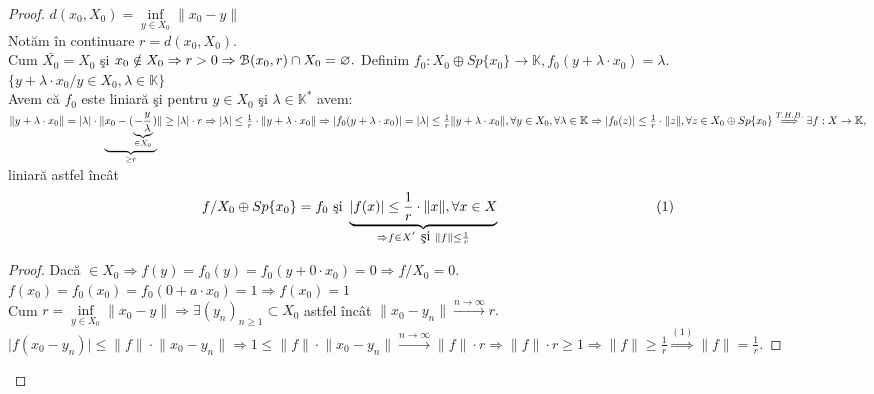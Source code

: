 \documentclass[ a4paper, 12pt]{report}
\theoremstyle{remark}
\numberwithin{equation}{section}
\begin{document}
\begin{proof}
$d(x_0,X_0) = \inf\limits_{y \in X_0} \lVert x_0 - y \rVert$\\
Not\u am \^in continuare $r = d(x_0,X_0).$\\
Cum $\bar{X_0} = X_0$ \c si $x_0 \notin X_0 \Rightarrow r>0\\
\Rightarrow \mathcal{B}(x_0,r) \cap X_0 = \varnothing.$
Definim $f_0 : X_0\oplus Sp\{x_0\} \rightarrow \mathbb{K}, f_0(y + \lambda \cdot x_0) = \lambda.$\\
$\{ y + \lambda \cdot x_0 / y \in X_0, \lambda \in \mathbb{K} \}$\\
Avem c\u a $f_0$ este liniar\u a \c si pentru $y \in X_0$ \c si $\lambda \in \mathbb{K}^{\ast}$ avem:\\
$\lVert  y + \lambda \cdot x_0 \rVert = \lvert \lambda \rvert \cdot \lVert \underbrace{ x_0 - (\underbrace{-\frac{y}{\lambda}}_{\in X_0})}_{\geq r} \rVert \geq \lvert \lambda \rvert \cdot r \Rightarrow \lvert \lambda \rvert \leq \frac{1}{r} \cdot \lVert y+\lambda \cdot x_0 \rVert \Rightarrow\\
 \lvert f_0(y + \lambda \cdot x_0) \rvert = \lvert \lambda \rvert \leq \frac{1}{r}\lVert y + \lambda \cdot x_0  \rVert, \forall y \in X_0, \forall \lambda \in \mathbb{K} \Rightarrow \lvert f_0(z) \rvert \leq \frac{1}{r} \cdot \lVert z \rVert, \forall z \in X_0 \oplus Sp\{x_0\} \stackrel{T.H.B.}{\Longrightarrow} \exists f : X \rightarrow \mathbb{K},$ liniar\u a astfel \^inc\^at\\
 \[f / X_0 \oplus Sp\{ x_0 \} = f_0\ \mbox{\c si}\ \underbrace{\lvert f(x) \rvert \leq \frac{1}{r} \cdot \lVert x \rVert, \forall x \in X}_{ \Rightarrow f \in X^{'}\ \mbox{\c si}\  \lVert f  \rVert \leq \frac{1}{r}}\hspace{40mm} (1)\]
 \begin{proof}
 Dac\u a $ \in X_0 \Rightarrow f(y) = f_0(y) = f_0(y + 0 \cdot x_0) = 0 \Rightarrow f/X_0 = 0.$\\
 $f(x_0) = f_0(x_0) = f_0(0 + a \cdot x_0) = 1 \Rightarrow f(x_0) = 1$\\
 Cum $r = \inf\limits_{y \in X_0} \lVert x_0 - y  \rVert \Rightarrow \exists (y_n)_{n \geq 1} \subset X_0$ astfel \^inc\^at $\lVert x_0 - y_n \rVert \stackrel{n \rightarrow \infty}{\longrightarrow} r.$\\
 $\lvert f(x_0 - y_n)  \rvert \leq \lVert f  \rVert \cdot \lVert x_0 - y_n \rVert \Rightarrow 1 \leq \lVert f \rVert \cdot \lVert x_0 - y_n \rVert \stackrel{n \rightarrow \infty}{\longrightarrow} \lVert f  \rVert \cdot r \Rightarrow \lVert f \rVert \cdot r \geq 1 \Rightarrow \lVert f \rVert \geq \frac{1}{r} \stackrel{(1)}{\Rightarrow} \lVert f \rVert = \frac{1}{r}. $
 \end{proof}
\end{proof}
\end{document}
